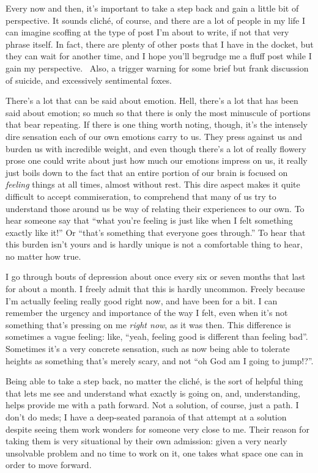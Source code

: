 Every now and then, it's important to take a step back and gain a little
bit of perspective. It sounds cliché, of course, and there are a lot of
people in my life I can imagine scoffing at the type of post I'm about
to write, if not that very phrase itself. In fact, there are plenty of
other posts that I have in the docket, but they can wait for another
time, and I hope you'll begrudge me a fluff post while I gain my
perspective. ~Also, a trigger warning for some brief but frank
discussion of suicide, and excessively sentimental foxes.

There's a lot that can be said about emotion. Hell, there's a lot that
has been said about emotion; so much so that there is only the most
minuscule of portions that bear repeating. If there is one thing worth
noting, though, it's the intensely dire sensation each of our own
emotions carry to us. They press against us and burden us with
incredible weight, and even though there's a lot of really flowery prose
one could write about just how much our emotions impress on us, it
really just boils down to the fact that an entire portion of our brain
is focused on \emph{feeling} things at all times, almost without rest.
This dire aspect makes it quite difficult to accept commiseration, to
comprehend that many of us try to understand those around us be way of
relating their experiences to our own. To hear someone say that ``what
you're feeling is just like when I felt something exactly like it!'' Or
``that's something that everyone goes through.'' To hear that this
burden isn't yours and is hardly unique is not a comfortable thing to
hear, no matter how true.

I go through bouts of depression about once every six or seven months
that last for about a month. I freely admit that this is hardly
uncommon. Freely because I'm actually feeling really good right now, and
have been for a bit. I can remember the urgency and importance of the
way I felt, even when it's not something that's pressing on me
\emph{right now}, as it was then. This difference is sometimes a vague
feeling: like, ``yeah, feeling good is different than feeling bad''.
Sometimes it's a very concrete sensation, such as now being able to
tolerate heights as something that's merely scary, and not ``oh God am I
going to jump!?''.

Being able to take a step back, no matter the cliché, is the sort of
helpful thing that lets me see and understand what exactly is going on,
and, understanding, helps provide me with a path forward. Not a
solution, of course, just a path. I don't do meds; I have a deep-seated
paranoia of that attempt at a solution despite seeing them work wonders
for someone very close to me. Their reason for taking them is very
situational by their own admission: given a very nearly unsolvable
problem and no time to work on it, one takes what space one can in order
to move forward.

